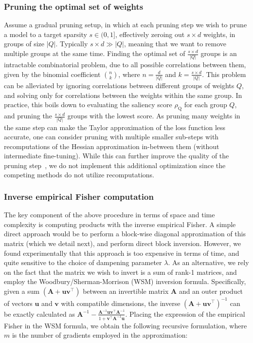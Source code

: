 \documentclass[11pt]{article}
\newcommand{\vect}[1]{\mathbf{#1}}
\newcommand{\subQ}{\textrm{Q}}
\begin{document}
\subsubsection{Pruning the optimal set of weights}

Assume a gradual pruning setup, in which at each pruning step we wish to prune a model to a target sparsity $s \in (0, 1]$, effectively zeroing out $s \times d$ weights, in groups of size $|Q|$. Typically $s \times d \gg |Q|$, meaning that we want to remove multiple groups at the same time. Finding the optimal set of $\frac{s \times d}{|Q|}$ groups is an intractable combinatorial problem, due to all possible correlations between them, given by the binomial coefficient $\binom{n}{k}$, where $n = \frac{d}{|Q|}$ and $k = \frac{s \times d}{|Q|}$. 
This problem can be alleviated by ignoring correlations between different groups of weights $Q$, and solving only for correlations between the weights within the same group. 
In practice, this boils down to evaluating the saliency score $\rho_\subQ$ for each group $Q$, and pruning the $\frac{s \times d}{|Q|}$ groups with the lowest score. 
As pruning many weights in the same step can make the Taylor approximation of the loss function less accurate, one can consider pruning with multiple smaller sub-steps with recomputations of the Hessian approximation in-between them (without intermediate fine-tuning). 
While this can further improve the quality of the pruning step~\cite{Frantar2021EfficientMA}, we do not implement this additional optimization since the competing methods do not utilize recomputations. 

\subsubsection{Inverse empirical Fisher computation}

The key component of the above procedure in terms of space and time complexity is computing products with the inverse empirical Fisher. 
A simple direct approach would be to perform a block-wise diagonal approximation of this matrix (which we detail next), and perform direct block inversion.
However, we found experimentally that this approach is too expensive in terms of time, and quite sensitive to the choice of dampening parameter $\lambda$. 
As an alternative, we rely on the fact that the matrix we wish to invert is a sum of rank-1 matrices, and employ the Woodbury/Sherman-Morrison (WSM) inversion formula. 
Specifically, given a sum $(\vect{A} + \vect{u}\vect{v}^\top)$ between an invertible matrix $\vect{A}$ and an outer product of vectors $\vect{u}$ and $\vect{v}$ with compatible dimensions, the inverse $(\vect{A} + \vect{u}\vect{v}^\top)^{-1}$ can be exactly calculated as $\vect{A}^{-1} - \frac{\vect{A}^{-1}\vect{u}\vect{v}^\top\vect{A}^{-1}}{1+\vect{v}^\top\vect{A}^{-1}\vect{u}}$. Placing the expression of the empirical Fisher in the WSM formula, we obtain the following recursive formulation, where $m$ is the number of gradients employed in the approximation:
\end{document}
